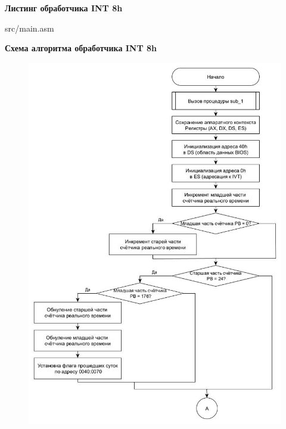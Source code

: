 \begin{center}
	{\bf\normalsize Листинг обработчика INT 8h}
\end{center}

\begin{lstinputlisting}[style={asm},linerange={1-102}]{src/main.asm}
\end{lstinputlisting}

\newpage
\begin{center}
	{\bf\normalsize Схема алгоритма обработчика INT 8h}
\end{center}

\begin{figure}[!ht]
	\begin{center}
		\includegraphics[width=16cm]{img/int8h.jpg}
	\end{center}
\end{figure}

